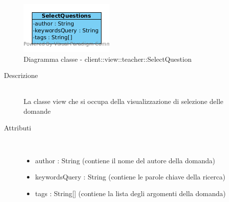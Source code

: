 \vspace{0.5cm}
\hypertarget{client::view::teacher::SelectQuestion}{}
\begin{center}
			\begin{figure}[H]
				\centering \includegraphics[scale=4, max width=\textwidth, max height=\myheight]{../img/diagrammiClassi/client/view/teacher/SelectQuestion.png}
				\caption{Diagramma classe - client::view::teacher::SelectQuestion}
			\end{figure}
		\end{center}\begin{description}
\item[Descrizione] \hfill \\
 La classe view che si occupa della visualizzazione di selezione delle domande
\item[Attributi] \hfill \\
 \vspace{-7mm}
\begin{itemize}
\item author : String (contiene il nome del autore della domanda)
\item keywordsQuery : String (contiene le parole chiave della ricerca)
\item tags : String[] (contiene la lista degli argomenti della domanda)
\end{itemize}

\end{description}

